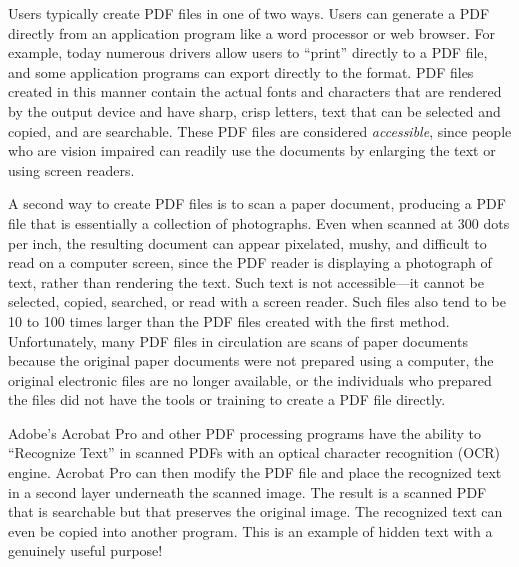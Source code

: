 Users typically create PDF files in one of two ways. Users can
generate a PDF directly from an application program like a word
processor or web browser.  For example, today numerous drivers allow
users to ``print'' directly to a PDF file, and some application
programs can export directly to the format. PDF files created in this
manner contain the actual fonts and characters that are rendered by the
output device and have sharp, crisp letters, text that can be
selected and copied, and are searchable. These PDF files are 
considered \emph{accessible}, since people who are vision impaired can readily use
the documents by enlarging the text or using screen readers.

A second way to create PDF files is to scan a paper
document, producing a PDF file that is essentially a collection of
photographs. Even when scanned at 300 dots per inch, the
resulting document can appear pixelated, mushy, and difficult to read on a
computer screen, since the PDF reader is displaying a photograph of text,
rather than rendering the text. Such
text is not accessible---it cannot be selected, copied, searched, or
read with a screen reader. Such files also tend to be 10 to 100 times
larger than the PDF files created with the first
method. Unfortunately, many PDF files in circulation are scans of
paper documents because
the original paper documents were not prepared using a computer,
the original electronic files are no longer  available, or the
individuals who prepared the files did not have the tools or 
training to create a PDF file directly.

Adobe's Acrobat Pro and other PDF processing programs have the ability
to ``Recognize Text'' in scanned PDFs with an optical character
recognition (OCR) engine. Acrobat Pro can then modify the PDF file and
place the recognized text in a second layer underneath the scanned
image. The result is a scanned PDF that is searchable but that
preserves the original image. The recognized text can even be copied
into another program. This is an example of hidden text with a
genuinely useful purpose!


